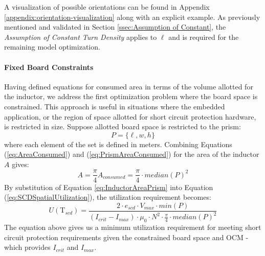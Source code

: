 A visualization of possible orientations can be found in Appendix \ref{appendix:orientation-visualization} along with an explicit example.
As previously mentioned and validated in Section \ref{ssec:Assumption of Constant}, the \textit{Assumption of Constant Turn Density} applies to $\ell$ and is required for the remaining model optimization.


\paragraph{Fixed Board Constraints}

Having defined equations for consumed area in terms of the volume allotted for the inductor, we address the first optimization problem where the board space is constrained.
This approach is useful in situations where the embedded application, or the region of space allotted for short circuit protection hardware, is restricted in size.
Suppose allotted board space is restricted to the prism:
\begin{equation}\label{eq:Prism2}
P = \{\ell, w, h\} \nonumber
\end{equation}
where each element of the set is defined in meters.
Combining Equations (\ref{eq:AreaConsumed}) and (\ref{eq:PrismAreaConsumed}) for the area of the inductor $A$ gives:
\begin{equation}\label{eq:InductorAreaPrism}
A = \frac{\pi}{4} A_{consumed} = \frac{\pi}{4} \cdot median(P)^2 \nonumber
\end{equation}
By substitution of Equation \ref{eq:InductorAreaPrism} into Equation (\ref{eq:SCDSpatialUtilization}), the utilization requirement becomes:
\begin{equation}\label{eq:MinUtilizationPrism}
U(\mathrm{T}_{scd}) = \frac{2 \cdot e_{scd} \cdot V_{max} \cdot min(P)}{(I_{crit}-I_{max}) \cdot \mu_0 \cdot N^{2} \cdot \frac{\pi}{4} \cdot median(P)^2}
\end{equation}
The equation above gives us a minimum utilization requirement for meeting short circuit protection requirements given the constrained board space and OCM - which provides $I_{crit}$ and $I_{max}$.

